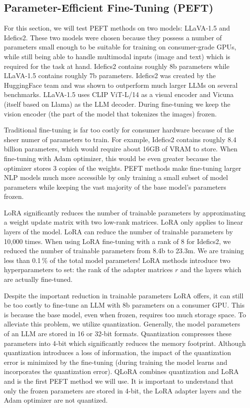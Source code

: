 \documentclass{article}
\begin{document}
\subsection{Parameter-Efficient Fine-Tuning (PEFT)}
For this section, we will test PEFT methods on two models: LLaVA-1.5\cite{liu2023llava} and Idefics2\cite{idefics2}. These
two models were chosen because they possess a number of parameters small enough to be suitable for training on consumer-grade GPUs, while still being able to handle multimodal inputs (image and text) which is required for the task at hand. Idefics2 contains roughly 8b parameters while LLaVA-1.5 contains roughly 7b parameters. Idefics2 was created by the HuggingFace team and was shown to outperform much larger LLMs on several benchmarks. LLaVA-1.5 uses CLIP ViT-L/14 as a visual encoder and Vicuna (itself based on Llama) as the LLM decoder. During fine-tuning we keep the vision encoder (the part of the model that tokenizes the images) frozen.\par

Traditional fine-tuning is far too costly for consumer hardware because of the sheer numer of parameters to train. For example, Idefics2 contains roughly 8.4 billion parameters, which would require about 16GB of VRAM to store. When fine-tuning with Adam optimizer, this would be even greater because the optimizer stores 3 copies of the weights. PEFT methods make fine-tuning larger NLP models much more accessible by only training a small subset of model parameters while keeping the vast majority of the base model's parameters frozen.\par

LoRA significantly reduces the number of trainable parameters by approximating a weight update matrix with two low-rank matrices. LoRA only applies to linear layers of the model. LoRA can reduce the number of trainable parameters by 10,000 times. When using LoRA fine-tuning with a rank of 8 for Idefics2, we reduced the number of trainable parameters from 8.4b to 23.3m. We are training less than 0.1\,\% of the total model parameters! LoRA methods introduce two hyperparameters to set: the rank of the adapter matrices $r$ and the layers which are actually fine-tuned.\par

Despite the important reduction in trainable parameters LoRA offers, it can still be too costly to fine-tune an LLM with 8b parameters on a consumer GPU. This is because the base model, even when frozen, requires too much storage space. To alleviate this problem, we utilize quantization. Generally, the model parameters of an LLM are stored in 16 or 32-bit formats. Quantization compresses these parameters into 4-bit which significantly reduces the memory footprint. Although quantization introduces a loss of information, the impact of the quantization error is minimized by the fine-tuning (during training the model learns and incorporates the quantization error). QLoRA combines quantization and LoRA and is the first PEFT method we will use. It is important to understand that only the frozen parameters are stored in 4-bit, the LoRA adapter layers and the Adam optimizer are not quantized.
\end{document}

